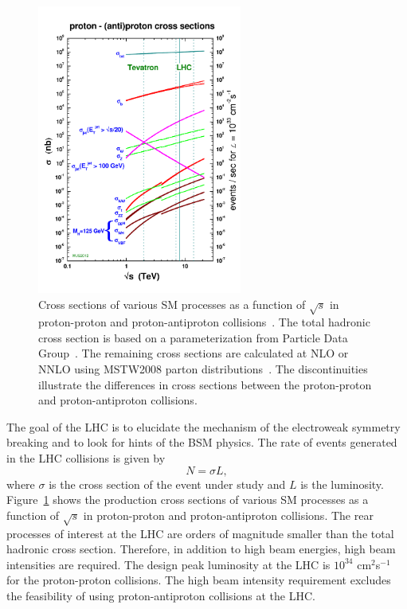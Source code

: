 \begin{figure}[h]
\centering
\includegraphics[width=0.6\textwidth]{figures_chapter2/crosssections2013}
\caption{Cross sections of various SM processes as a function of $\sqrt{s}$ in proton-proton and proton-antiproton collisions~\cite{sterling}. The total hadronic cross section is based on a parameterization from Particle Data Group~\cite{Agashe:2014kda}. The remaining cross sections are calculated at NLO or NNLO using MSTW2008 parton distributions~\cite{MSTW}. The discontinuities illustrate the differences in cross sections between the proton-proton and proton-antiproton collisions.}
\label{fig:xsec}
\end{figure}

The goal of the LHC is to elucidate the mechanism of the electroweak symmetry breaking and to look for hints of the BSM physics. The rate of events generated in the LHC collisions is given by 
\begin{equation} \label{eq:lumi}
N = \sigma L,
\end{equation}
where $\sigma$ is the cross section of the event under study and $L$ is the luminosity. Figure~\ref{fig:xsec} shows the production cross sections of various SM processes as a function of $\sqrt{s}$ in proton-proton and proton-antiproton collisions. The rear processes of interest at the LHC are orders of magnitude smaller than the total hadronic cross section. Therefore, in addition to high beam energies, high beam intensities are required. The design peak luminosity at the LHC is $10^{34}$ cm$^2$s$^{-1}$ for the proton-proton collisions. The high beam intensity requirement excludes the feasibility of using proton-antiproton collisions at the LHC. 


